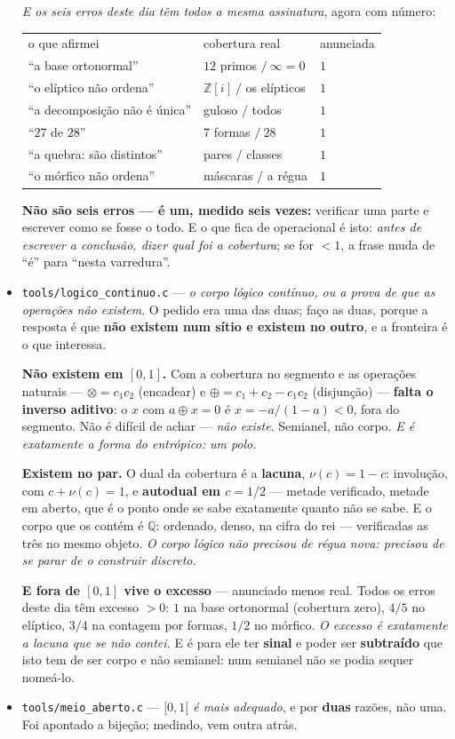 \documentclass[11pt]{article}
\newcommand{\code}[1]{\texttt{\small #1}}
\newcommand{\Z}{\mathbb Z}
\newcommand{\Q}{\mathbb Q}
\theoremstyle{plain}
\theoremstyle{remark}
\begin{document}
\begin{itemize}
\emph{E os seis erros deste dia têm todos a mesma assinatura}, agora com número:

\begin{center}\begin{tabular}{lll}
o que afirmei & cobertura real & anunciada \\
``a base ortonormal'' & $12$ primos $/\ \infty = 0$ & $1$ \\
``o elíptico não ordena'' & $\Z[i]\ /$ os elípticos & $1$ \\
``a decomposição não é única'' & guloso $/$ todos & $1$ \\
``$27$ de $28$'' & $7$ formas $/\ 28$ & $1$ \\
``a quebra: são distintos'' & pares $/$ classes & $1$ \\
``o mórfico não ordena'' & máscaras $/$ a régua & $1$ \\
\end{tabular}\end{center}

\textbf{Não são seis erros --- é um, medido seis vezes:} verificar uma parte e escrever como se
fosse o todo. E o que fica de operacional é isto: \emph{antes de escrever a conclusão, dizer qual
foi a cobertura}; se for $<1$, a frase muda de ``é'' para ``nesta varredura''.
\item \code{tools/logico\_continuo.c} --- \emph{o corpo lógico contínuo, ou a prova de que as
operações não existem}. O pedido era uma das duas; faço as duas, porque a resposta é que
\textbf{não existem num sítio e existem no outro}, e a fronteira é o que interessa.

\textbf{Não existem em $[0,1]$.} Com a cobertura no segmento e as operações naturais ---
$\otimes = c_1c_2$ (encadear) e $\oplus = c_1+c_2-c_1c_2$ (disjunção) --- \textbf{falta o inverso
aditivo}: o $x$ com $a \oplus x = 0$ é $x = -a/(1-a) < 0$, fora do segmento. Não é difícil de
achar --- \emph{não existe}. Semianel, não corpo. \emph{E é exatamente a forma do entrópico: um
polo.}

\textbf{Existem no par.} O dual da cobertura é a \textbf{lacuna}, $\nu(c) = 1-c$: involução, com
$c + \nu(c) = 1$, e \textbf{autodual em $c = 1/2$} --- metade verificado, metade em aberto, que é
o ponto onde se sabe exatamente quanto não se sabe. E o corpo que os contém é $\Q$: ordenado,
denso, na cifra do rei --- verificadas as três no mesmo objeto. \emph{O corpo lógico não precisou
de régua nova: precisou de se parar de o construir discreto.}

\textbf{E fora de $[0,1]$ vive o excesso} --- anunciado menos real. Todos os erros deste dia têm
excesso $> 0$: $1$ na base ortonormal (cobertura zero), $4/5$ no elíptico, $3/4$ na contagem por
formas, $1/2$ no mórfico. \emph{O excesso é exatamente a lacuna que se não contei.} E é para ele
ter \textbf{sinal} e poder ser \textbf{subtraído} que isto tem de ser corpo e não semianel: num
semianel não se podia sequer nomeá-lo.
\item \code{tools/meio\_aberto.c} --- \emph{$[0,1[$ é mais adequado}, e por \textbf{duas}
razões, não uma. Foi apontado a bijeção; medindo, vem outra atrás.


\end{itemize}
\end{document}
